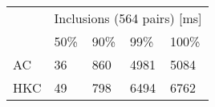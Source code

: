 \begin{tabular}{l|llll|}
\multirow{2}{*}{} & \multicolumn{4}{l|}{Inclusions (564 pairs) {[}ms{]}} \\ \cline{2-5}
                  & 50\%      & 90\%      & 99\%     & 100\%    \\ \hline
AC                & 36     & 860     & 4981    & 5084    \\
HKC               & 49     & 798     & 6494    & 6762    \\
\end{tabular}
